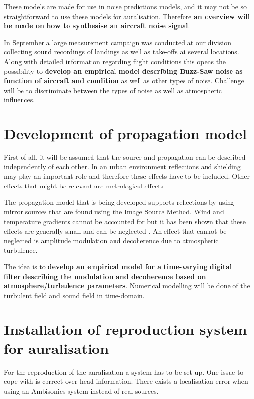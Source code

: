 These models are made for use in noise predictions models, and it may not be so 
straightforward to use these models for auralisation.
Therefore \textbf{an overview will be made on how to synthesise an aircraft noise 
signal}.

In September a large measurement campaign was conducted at our division 
collecting sound recordings of landings as well as take-offs at several 
locations. Along with detailed information regarding flight conditions this opens the 
possibility to \textbf{develop an empirical model describing Buzz-Saw noise as 
function of aircraft and condition} as well as other types of noise.
Challenge will be to discriminate between the types of noise as well as 
atmospheric influences.



\section*{Development of propagation model}
First of all, it will be assumed that the source and propagation can be 
described independently of each other. In an urban environment reflections and 
shielding may play an important role and therefore these effects have to be 
included. Other effects that might be relevant are metrological effects.

The propagation model that is being developed supports reflections by using 
mirror sources that are found using the Image Source Method. Wind and temperature 
gradients cannot be accounted for but it has been shown that these effects are 
generally small and can be neglected \cite{Arntzen2012}. An effect that cannot 
be neglected is amplitude modulation and decoherence due to atmospheric turbulence.

The idea is to \textbf{develop an empirical model for a time-varying digital filter describing 
the modulation and decoherence based on atmosphere/turbulence parameters}.
Numerical modelling will be done of the turbulent field and sound field in time-domain.


\section*{Installation of reproduction system for auralisation}
For the reproduction of the auralisation a system has to be set up. One issue to 
cope with is correct over-head information. There exists a localisation error 
when using an Ambisonics system instead of real sources. 

